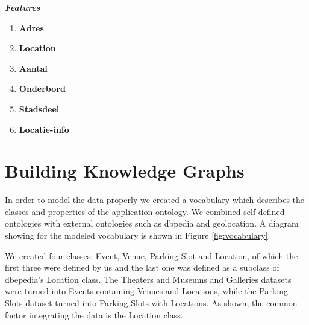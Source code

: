 \documentclass[runningheads,a4paper]{../../StyleFiles/llncs}
\begin{document}
\begin{center}
	\textbf{\emph{Features}}
	\setlength{\columnsep}{4em}
	\begin{multicols}{2}
		\begin{enumerate}
			\item \textbf{Adres}
			\item \textbf{Location}
			\item \textbf{Aantal}
			\item \textbf{Onderbord}
			\item \textbf{Stadsdeel}	
			\item \textbf{Locatie-info}				
		\end{enumerate}
	\end{multicols}
\end{center} 

\section{Building Knowledge Graphs}
In order to model the data properly we created a vocabulary which describes the classes and properties of the application ontology. We combined self defined ontologies with external ontologies such as dbpedia and geolocation. A diagram showing for the modeled vocabulary is shown in Figure \ref{fig:vocabulary}. 

We created four classes: Event, Venue, Parking Slot and Location, of which the first three were defined by us and the last one was defined as a subclass of dbepedia's Location class. The Theaters and Museums and Galleries datasets were turned into Events containing Venues and Locations, while the Parking Slots dataset turned into Parking Slots with Locations. As shown, the common factor integrating the data is the Location class. 
\end{document}
